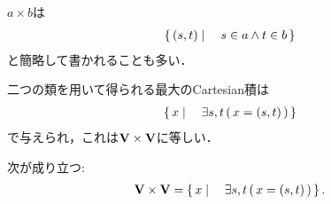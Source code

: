 	$a \times b$は
	\begin{align}
		\left\{\, (s,t) \mid \quad s \in a \wedge t \in b\, \right\} 
	\end{align}
	と簡略して書かれることも多い．
	
	\begin{comment}
	\monologue{
		院生「類$a$と類$b$のCartesian 積は
			\begin{align}
				a \times b = \Set{(s,t)}{s \in a \wedge t \in b} 
			\end{align}
			と簡略して書かれることも多いです．ところで他の本やネットなどを見ていると
			Cartesian 積を直積とも呼んでいるそうです．本稿でも後で直積というものを定義いたしますが，
			本稿ではCartesian 積と直積を明確に区別いたします．
			これは巷にあふれる直積の定義の不自然さを解消するためです．
			どういう点が不自然であるか簡単に説明いたしましょう．
			まだ有限とか数だとか定義していませんが，説明の便宜のために使用いたします．
			よく見る直積の定義だと，有限か有限でないかで直積の定め方が変わります．
			\begin{align}
				I_1 \times I_2 \times \cdots \times I_n 
				= \Set{(x_1,x_2,\cdots,x_n)}{x_1 \in I_1 \wedge x_2 \in I_2 \wedge
				\cdots \wedge x_n \in I_n}
			\end{align}
			そして
			\begin{align}
				I_1 \times I_2 \times \cdots \times I_n 
				= \prod_{i=1}^n I_i
			\end{align}
			と書いている．ここで
			$\prod_{i=1}^n I_i$は$\prod_{i\in\{1,2,\cdots,n\}} I_i$の別の記法です．
			他方$I$を$\{1,2,\cdots,n\}$から$V$への写像と見ることもできますから
			\begin{align}
				\prod_{i=1}^n I_i = \Set{f}{f:\{1,2,\cdots,n\} \longrightarrow V \wedge \forall i \in \{1,2,\cdots,n\}\ (\ f(i) \in I_i\ )}
			\end{align}
			となるはずです．食い違います．
			」
	}
	\end{comment}
	
	二つの類を用いて得られる最大のCartesian積は
	\begin{align}
		\left\{\, x \mid \quad \exists s,t\, (\, x=(s,t)\, )\, \right\}
	\end{align}
	で与えられ，これは$\mathbf{V} \times \mathbf{V}$に等しい．
	
	\begin{screen}
		\begin{thm}
			次が成り立つ:
			\begin{align}
				\mathbf{V} \times \mathbf{V} = \left\{\, x \mid \quad \exists s,t\, (\, x=(s,t)\, )\, \right\}.
			\end{align}
		\end{thm}
	\end{screen}
	
